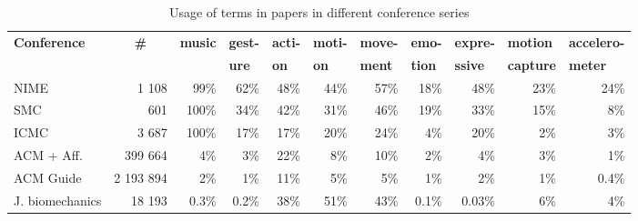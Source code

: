 \begin{table*}[t]
\centering
{}
\caption{Usage of terms in papers in different conference series}
\vspace{3pt} \noindent
\begin{small}
\begin{tabular}{lrrrrrrrrrr}
\midrule
\multicolumn{1}{l}{\textbf{Conference}} & \multicolumn{1}{c}{\textbf{\#}} & \multicolumn{1}{l}{\textbf{music}} & \multicolumn{1}{l}{\textbf{gest-}} & \multicolumn{1}{l}{\textbf{acti-}} & \multicolumn{1}{l}{\textbf{moti-}} & \multicolumn{1}{l}{\textbf{move-}} & \multicolumn{1}{l}{\textbf{emo-}} & \multicolumn{1}{l}{\textbf{expre-}} & \multicolumn{1}{l}{\textbf{motion}} & \multicolumn{1}{l}{\textbf{accelero-}} \\ \multicolumn{1}{l}{\textbf{}} & \multicolumn{1}{c}{\textbf{}} 		& \multicolumn{1}{l}{\textbf{}} & \multicolumn{1}{l}{\textbf{ure}} & \multicolumn{1}{l}{\textbf{on}} & \multicolumn{1}{l}{\textbf{on}} & \multicolumn{1}{l}{\textbf{ment}} & \multicolumn{1}{l}{\textbf{tion}} & \multicolumn{1}{l}{\textbf{ssive}} & \multicolumn{1}{l}{\textbf{capture}} & \multicolumn{1}{l}{\textbf{meter}} \\
\toprule  
NIME 			& 1 108 	& 99\% 	& 62\% 	& 48\% 	& 44\% 	& 57\% 	& 18\% 	& 48\% 	& 23\%	 & 24\% \\ 
SMC 			& 601 		& 100\% 	& 34\% 	& 42\% 	& 31\% 	& 46\% 	& 19\% 	& 33\% 	& 15\%	 & 8\% \\ 
ICMC 			& 3 687 	& 100\% 	& 17\% 	& 17\% 	& 20\% 	& 24\% 	& 4\% 		& 20\% 	& 2\%	 & 3\% \\ 
ACM + Aff. 		& 399 664 	& 4\% 		& 3\% 		& 22\% 	& 8\% 		& 10\% 	& 2\% 		& 4\% 		& 3\%	 & 1\% \\ 
ACM Guide 		& 2 193 894 & 2\% 		& 1\% 		& 11\% 	& 5\% 		& 5\% 		& 1\% 		& 2\% 		& 1\%	 & 0.4\% \\ 
J. biomechanics & 18 193 	& 0.3\% 	& 0.2\% 	& 38\% 	& 51\% 	& 43\% 	& 0.1\% 	& 0.03\%	& 6\%	 & 4\%  \\ 
\midrule
\end{tabular}
\end{small}
\label{Jensenius:tab:other}
\end{table*}



